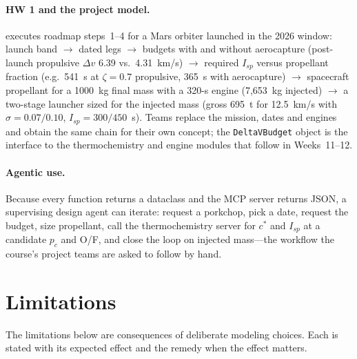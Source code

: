 \documentclass[11pt,a4paper]{article}
\newcommand{\dv}{\Delta v}
\newcommand{\code}[1]{\texttt{#1}}
\begin{document}
\paragraph{HW 1 and the project model.} 
executes roadmap steps~1--4 for a Mars orbiter launched in the 2026 window: launch band
$\rightarrow$ dated legs $\rightarrow$ budgets with and without aerocapture (post-launch
propulsive $\dv$ 6.39 vs.\ 4.31~km/s) $\rightarrow$ required $I_{sp}$ versus propellant fraction
(e.g.\ 541~s at $\zeta=0.7$ propulsive, 365~s with aerocapture) $\rightarrow$ spacecraft
propellant for a \SI{1000}{kg} final mass with a 320-s engine (7,653~kg injected) $\rightarrow$
a two-stage launcher sized for the injected mass (gross \SI{695}{t} for \SI{12.5}{km/s}
with $\sigma=0.07/0.10$, $I_{sp}=300/450$~s). Teams replace the mission, dates and engines and
obtain the same chain for their own concept; the \code{DeltaVBudget} object is the interface to
the thermochemistry and engine modules that follow in Weeks~11--12.

\paragraph{Agentic use.} Because every function returns a dataclass and the MCP server
returns JSON, a supervising design agent can iterate: request a porkchop, pick a date, request
the budget, size propellant, call the thermochemistry server for $c^*$ and $I_{sp}$ at a
candidate $p_c$ and O/F, and close the loop on injected mass---the workflow the course's
project teams are asked to follow by hand.

\section{Limitations}\label{sec:limits}
The limitations below are consequences of deliberate modeling choices. Each is stated with
its expected effect and the remedy when the effect matters.
\end{document}
